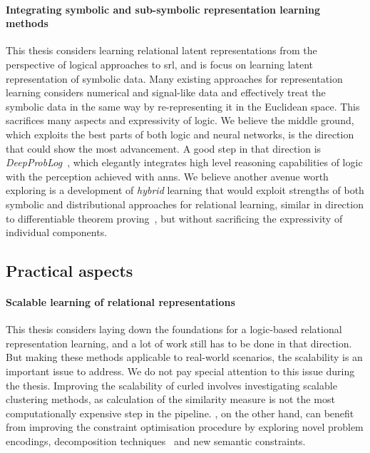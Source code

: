 \paragraph{Integrating symbolic and sub-symbolic representation learning methods}
This thesis considers learning relational latent representations from the perspective of logical approaches to \gls{srl}, and is focus on learning latent representation of symbolic data.
Many existing approaches for representation learning considers numerical and signal-like data and effectively treat the symbolic data in the same way by re-representing it in the Euclidean space.
This sacrifices many aspects and expressivity of logic.
We believe the middle ground, which exploits the best parts of both logic and neural networks, is the direction that could show the most advancement.
A good step in that direction is \textit{DeepProbLog}~\cite{DBLP:journals/corr/abs-1805-10872}, which elegantly integrates high level reasoning capabilities of logic with the perception achieved with \gls{ann}s.
We believe another avenue worth exploring is a development of \textit{hybrid} learning that would exploit strengths of both symbolic and distributional approaches for relational learning, similar in direction to differentiable theorem proving~\cite{DTP2017}, but without sacrificing the expressivity of individual components.






\subsection{Practical aspects}


\paragraph{Scalable learning of relational representations}
This thesis considers laying down the foundations for a logic-based relational representation learning, and a lot of work still has to be done in that direction.
But making these methods applicable to real-world scenarios, the scalability is an important issue to address.
We do not pay special attention to this issue during the thesis.
Improving the scalability of \gls{curled} involves investigating scalable clustering methods, as calculation of the similarity measure is not the most computationally expensive step in the pipeline.
, on the other hand, can benefit from improving the constraint optimisation procedure by exploring novel problem encodings, decomposition techniques~\cite{decompositions,Friesen:2015:RDN:2832249.2832284}  and new semantic constraints.



